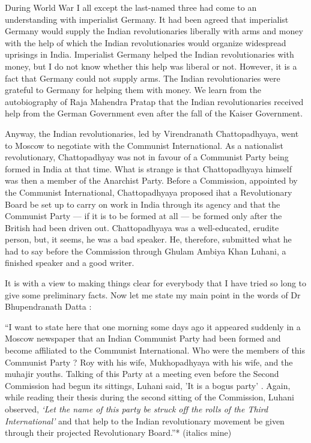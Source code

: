 During World War I all except the last-named three had come to an understanding with imperialist Germany. It had been agreed that imperialist Germany would supply the Indian revolutionaries liberally with arms and money with the help of which the Indian revolutionaries would organize widespread uprisings in India. Imperialist Germany helped the Indian revolutionaries with money, but I do not know whether this help was liberal or not. However, it is a fact that Germany could not supply arms. The Indian revolutionaries were grateful to Germany for helping them with money. We learn from the autobiography of Raja Mahendra Pratap that the Indian revolutionaries received help from the German Government even after the fall of the Kaiser Government. 

Anyway, the Indian revolutionaries, led by Virendranath Chattopadhyaya, went to Moscow to negotiate with the Communist International. As a nationalist revolutionary, Chattopadhyay was not in favour of a Communist Party being formed in India at that time. What is strange is that Chattopadhyaya himself was then a member of the Anarchist Party. Before a Commission, appointed by the Communist International, Chattopadhyaya proposed ihat a Revolutionary Board be set up to carry on work in India through its agency and that the Communist Party — if it is to be formed at all — be formed only after the British had been driven out. Chattopadhyaya was a well-educated, erudite person, but, it seems, he was a bad speaker. He, therefore, submitted what he had to say before the Commission through Ghulam Ambiya Khan Luhani, a finished speaker and a good writer. 

It is with a view to making things clear for everybody that I have tried so long to give some preliminary facts. Now let me state my main point in the words of Dr Bhupendranath Datta : 

“I want to state here that one morning some days ago it appeared suddenly in a Moscow newspaper that an Indian Communist Party had been formed and become affiliated to the Communist International. Who were the members of this Communist Party ? Roy with his wife, Mukhopadhyaya with his wife, and the muhajir youths. Talking of this Party at a meeting even before the Second Commission had begun its sittings, Luhani said, 'It is a bogus party’ . Again, while reading their thesis during the second sitting of the Commission, Luhani observed, \textit{‘Let the name of this party be struck off the rolls of the Third International'} and that help to the Indian revolutionary movement be given through their projected Revolutionary Board.”* (italics mine) 

